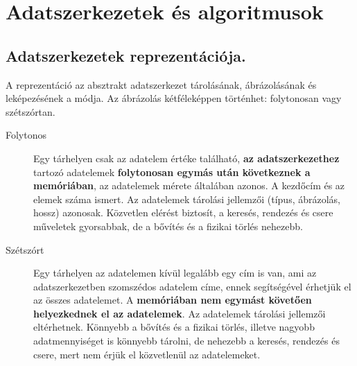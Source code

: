 \section{Adatszerkezetek és algoritmusok}
\subsection{Adatszerkezetek reprezentációja.}
A reprezentáció az absztrakt adatszerkezet tárolásának, ábrázolásának és leképezésének a módja. Az ábrázolás kétféleképpen történhet: folytonosan vagy szétszórtan.
\begin{description}
	\item[Folytonos] Egy tárhelyen csak az adatelem értéke található, \textbf{az adatszerkezethez} tartozó adatelemek \textbf{folytonosan egymás után következnek a memóriában}, az adatelemek mérete általában azonos. A kezdőcím és az elemek száma ismert. Az adatelemek tárolási jellemzői (típus, ábrázolás, hossz) azonosak. Közvetlen elérést biztosít, a keresés, rendezés és csere műveletek gyorsabbak, de a bővítés és a fizikai törlés nehezebb.
	\item[Szétszórt] Egy tárhelyen az adatelemen kívül legalább egy cím is van, ami az adatszerkezetben szomszédos adatelem címe, ennek segítségével érhetjük el az összes adatelemet. A \textbf{memóriában nem egymást követően helyezkednek el az adatelemek}. Az adatelemek tárolási jellemzői eltérhetnek. Könnyebb a bővítés és a fizikai törlés, illetve nagyobb adatmennyiséget is könnyebb tárolni, de nehezebb a keresés, rendezés és csere, mert nem érjük el közvetlenül az adatelemeket.
\end{description}


